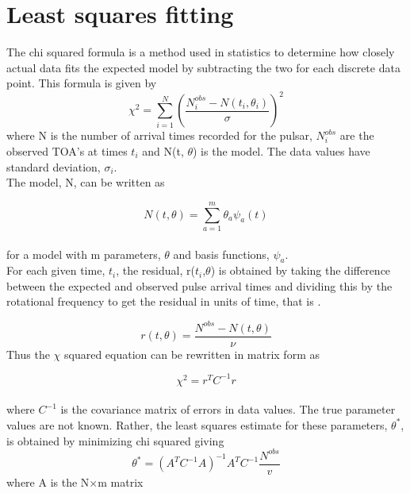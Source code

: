 \documentclass[12pt]{article}
\begin{document}
	\section{Least squares fitting}\label{Least squares fitting}
	
	The chi squared formula is a method used in statistics to determine how closely actual data fits the expected model by subtracting the two for each discrete data point. This formula is given by
	\begin{equation}\label{chi squared sum form}
	\chi^2={\sum_{i=1}^{N} (\frac{N_i^{obs}-N(t_i,\theta_i)}{\sigma})}^2
	\end{equation}
	where N is the number of arrival times recorded for the pulsar, $N_i^{obs}$ are the observed TOA's at times $t_i$ and N(t, $\theta$) is the model. The data values have standard deviation, $\sigma_i$.\\
	The model, N, can be written as 
	
	\begin{equation}\label{model N}
	N(t,\theta)={\sum_{a=1}^{m}\theta_a \psi_a (t)}
	\end{equation}\\
	for a model with m parameters, $\theta$ and basis functions, $\psi_a$.\\
	For each given time, $t_i$, the residual, r($t_i$,$\theta$) is obtained by taking the difference between the expected and observed pulse arrival times and dividing this by the rotational frequency to get the residual in units of time, that is \cite{kopeikin1999millisecond}.
	
	\begin{equation}\label{residual r relating to model N}
	r(t,\theta)=\frac{N^{obs}-N(t,\theta)}{\nu}
	\end{equation}
	Thus the $\chi$ squared equation can be rewritten in matrix form as
	
	\begin{equation}\label{chi squared matrix form}
	\chi^2=r^{T}C^{-1}r
	\end{equation}\\
	where $C^{-1}$ is the covariance matrix of errors in data values. 
	The true parameter values are not known. Rather, the least squares estimate for these parameters, $\theta^*$, is obtained by minimizing chi squared giving 
	\begin{equation}\label{theta parameter equation}
	\theta^*=(A^{T}C^{-1}A)^{-1}A^{T}C^{-1}\frac{N^{obs}}{v}
	\end{equation}
	where A is the N$\times$m matrix 
	
\end{document}
